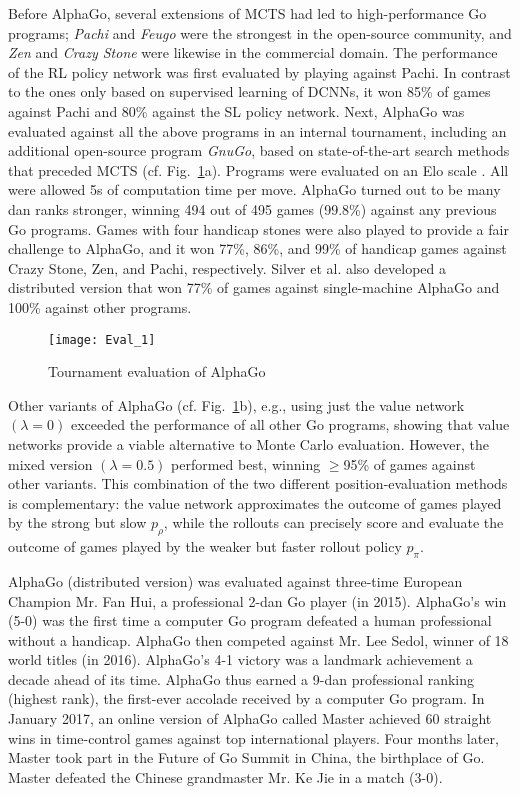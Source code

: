 Before AlphaGo, several extensions of MCTS had led to high-performance Go programs; \textit{Pachi}\cite{b29} and \textit{Feugo}\cite{b30} were the strongest in the open-source community, and \textit{Zen} and \textit{Crazy Stone}\cite{b31} were likewise in the commercial domain. The performance of the RL policy network was first evaluated by playing against Pachi. In contrast to the ones only based on supervised learning of DCNNs\cite{b32, b33}, it won 85\% of games against Pachi and 80\% against the SL policy network. Next, AlphaGo was evaluated against all the above programs in an internal tournament, including an additional open-source program \textit{GnuGo}, based on state-of-the-art search methods that preceded MCTS (cf. Fig.~\ref{Eval_AplhaGo}a). Programs were evaluated on an Elo scale \cite{b34}. All were allowed 5s of computation time per move. AlphaGo turned out to be many dan ranks stronger, winning 494 out of 495 games (99.8\%) against any previous Go programs. Games with four handicap stones were also played to provide a fair challenge to AlphaGo, and it won 77\%, 86\%, and 99\% of handicap games against Crazy Stone, Zen, and Pachi, respectively. Silver et al.\cite{b12} also developed a distributed version that won 77\% of games against single-machine AlphaGo and 100\% against other programs. 
\begin{figure}[t]
    \centering
    \texttt{[image: Eval\_1]}
    \caption{Tournament evaluation of AlphaGo\cite{b12}}
    \label{Eval_AplhaGo}
\end{figure}
Other variants of AlphaGo (cf. Fig.~\ref{Eval_AplhaGo}b), e.g., using just the value network $(\lambda=0)$ exceeded the performance of all other Go programs, showing that value networks provide a viable alternative to Monte Carlo evaluation. However, the mixed version $(\lambda=0.5)$ performed best, winning $\geq$95\% of games against other variants. This combination of the two different position-evaluation methods is complementary: the value network approximates the outcome of games played by the strong but slow $p_\rho$, while the rollouts can precisely score and evaluate the outcome of games played by the weaker but faster rollout policy $p_\pi$.

AlphaGo (distributed version) was evaluated against three-time European Champion Mr. Fan Hui, a professional 2-dan Go player (in 2015). AlphaGo's win (5-0) was the first time a computer Go program defeated a human professional without a handicap. AlphaGo then competed against Mr. Lee Sedol, winner of 18 world titles (in 2016). AlphaGo's 4-1 victory was a landmark achievement a decade ahead of its time. AlphaGo thus earned a 9-dan professional ranking (highest rank), the first-ever accolade received by a computer Go program. In January 2017, an online version of AlphaGo called Master achieved 60 straight wins in time-control games against top international players. Four months later, Master took part in the Future of Go Summit in China, the birthplace of Go. Master defeated the Chinese grandmaster Mr. Ke Jie in a match (3-0). 